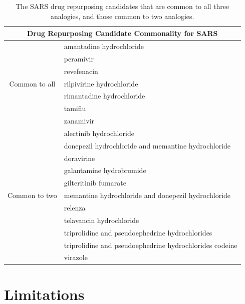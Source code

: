 \documentclass{article}
\begin{document}
\begin{table}[t!]
\footnotesize
\centering
\caption{The SARS drug repurposing candidates that are common to all three analogies, and those common to two analogies.}
\label{tab:drug_venn_23}
\begin{tabular}{c l}
\hline
\multicolumn{2}{c}{Drug Repurposing Candidate Commonality for SARS} \\
\hline
\multirow{7}{*}{Common to all} & amantadine hydrochloride \\ 
& peramivir \\ 
& revefenacin \\ 
& rilpivirine hydrochloride \\ 
& rimantadine hydrochloride \\ 
& tamiflu \\ 
& zanamivir \\
\hline
\multirow{11}{*}{Common to two} & alectinib hydrochloride \\ 
& donepezil hydrochloride and memantine hydrochloride \\ 
& doravirine \\ 
& galantamine hydrobromide \\ 
& gilteritinib fumarate \\ 
& memantine hydrochloride and donepezil hydrochloride \\ 
& relenza \\ 
& telavancin hydrochloride \\ 
& triprolidine and pseudoephedrine hydrochlorides \\ 
& triprolidine and pseudoephedrine hydrochlorides codeine \\ 
& virazole \\
\hline
\end{tabular}
\end{table}


\section{Limitations}
\end{document}

